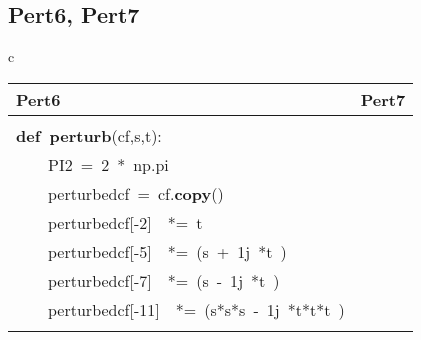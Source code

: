 \documentclass{article}\usepackage[]{graphicx}\usepackage[dvipsnames,table]{xcolor}
\makeatletter
\newcommand{\hlnum}[1]{\textcolor[rgb]{0.686,0.059,0.569}{#1}}%
\newcommand{\hlopt}[1]{\textcolor[rgb]{0,0,0}{#1}}%
\newcommand{\hldef}[1]{\textcolor[rgb]{0.345,0.345,0.345}{#1}}%
\newcommand{\hlkwa}[1]{\textcolor[rgb]{0.161,0.373,0.58}{\textbf{#1}}}%
\newcommand{\hlkwb}[1]{\textcolor[rgb]{0.69,0.353,0.396}{#1}}%
\newcommand{\hlkwd}[1]{\textcolor[rgb]{0.737,0.353,0.396}{\textbf{#1}}}%
\newenvironment{kframe}{%
 \def\at@end@of@kframe{}%
 \ifinner\ifhmode%
  \def\at@end@of@kframe{\end{minipage}}%
  \begin{minipage}{\columnwidth}%
 \fi\fi%
 \def\FrameCommand##1{\hskip\@totalleftmargin \hskip-\fboxsep
 \colorbox{shadecolor}{##1}\hskip-\fboxsep
     \hskip-\linewidth \hskip-\@totalleftmargin \hskip\columnwidth}%
 \MakeFramed {\advance\hsize-\width
   \@totalleftmargin\z@ \linewidth\hsize
   \@setminipage}}%
 {\par\unskip\endMakeFramed%
 \at@end@of@kframe}
\newenvironment{knitrout}{}{} %
\makeatother
\begin{document}
\subsection{Pert6, Pert7}
\begin{center}
\begin{tabular}{c}
\begin{tabular}{m{10cm}m{10cm}}
\toprule
Pert6 & Pert7 \\
\midrule
\begin{minipage}[m]{10cm}
\begin{knitrout}\tiny
\definecolor{shadecolor}{rgb}{0.969, 0.969, 0.969}\color{fgcolor}\begin{kframe}
\noindent
\ttfamily
\hldef{}\hlkwb{@njit}\hspace*{\fill}\\
\hldef{}\hlkwa{def\ }\hldef{}\hlkwd{perturb\textunderscore 6}\hldef{}\hlopt{(}\hldef{cf}\hlopt{,}\hldef{s}\hlopt{,}\hldef{t}\hlopt{):}\hspace*{\fill}\\
\hldef{}\hldef{\ \ \ \ }\hldef{PI2\ }\hlopt{=\ }\hldef{}\hlnum{2\ }\hldef{}\hlopt{{*}\ }\hldef{np}\hlopt{.}\hldef{pi}\hspace*{\fill}\\
\hldef{}\hldef{\ \ \ \ }\hldef{perturbed\textunderscore cf\ }\hlopt{=\ }\hldef{cf}\hlopt{.}\hldef{}\hlkwd{copy}\hldef{}\hlopt{()}\hspace*{\fill}\\
\hldef{}\hldef{\ \ \ \ }\hldef{perturbed\textunderscore cf}\hlopt{{[}{-}}\hldef{}\hlnum{2}\hldef{}\hlopt{{]}}\hldef{\ \ }\hlopt{{*}=\ }\hldef{t}\hspace*{\fill}\\
\hldef{}\hldef{\ \ \ \ }\hldef{perturbed\textunderscore cf}\hlopt{{[}{-}}\hldef{}\hlnum{5}\hldef{}\hlopt{{]}}\hldef{\ \ }\hlopt{{*}=\ (}\hldef{s\ }\hlopt{+\ }\hldef{}\hlnum{1}\hldef{j\ }\hlopt{{*}}\hldef{t\ }\hlopt{)}\hspace*{\fill}\\
\hldef{}\hldef{\ \ \ \ }\hldef{perturbed\textunderscore cf}\hlopt{{[}{-}}\hldef{}\hlnum{7}\hldef{}\hlopt{{]}}\hldef{\ \ }\hlopt{{*}=\ (}\hldef{s\ }\hlopt{{-}\ }\hldef{}\hlnum{1}\hldef{j\ }\hlopt{{*}}\hldef{t\ }\hlopt{)}\hspace*{\fill}\\
\hldef{}\hldef{\ \ \ \ }\hldef{perturbed\textunderscore cf}\hlopt{{[}{-}}\hldef{}\hlnum{11}\hldef{}\hlopt{{]}}\hldef{\ \ }\hlopt{{*}=\ (}\hldef{s}\hlopt{{*}}\hldef{s}\hlopt{{*}}\hldef{s\ }\hlopt{{-}\ }\hldef{}\hlnum{1}\hldef{j\ }\hlopt{{*}}\hldef{t}\hlopt{{*}}\hldef{t}\hlopt{{*}}\hldef{t\ }\hlopt{)}\hspace*{\fill}\\

\end{kframe}
\end{knitrout}
\end{minipage}
\end{tabular}
\end{tabular}
\end{center}
\end{document}
